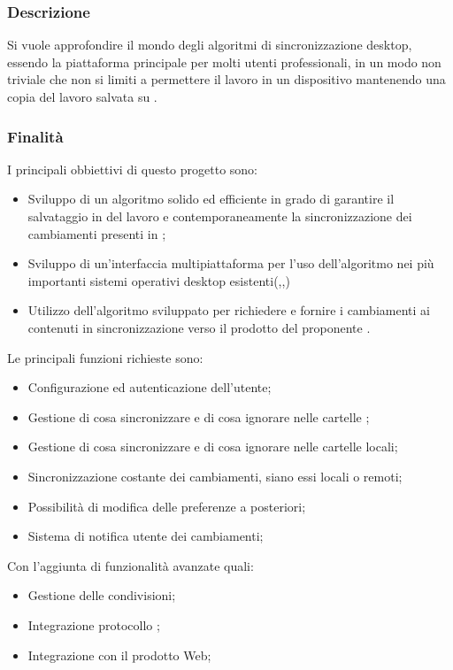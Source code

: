 \documentclass[]{article}
\begin{document}
		\subsubsection{Descrizione}
		Si vuole approfondire il mondo degli algoritmi di sincronizzazione desktop, essendo la piattaforma principale per molti utenti professionali, in un modo non triviale che non si limiti a permettere il lavoro in un dispositivo mantenendo una copia del lavoro salvata su .
		
		\subsubsection{Finalità}
		I principali obbiettivi di questo progetto sono:
		\begin{itemize}
			\item Sviluppo di un algoritmo solido ed efficiente in grado di garantire il salvataggio in  del lavoro e contemporaneamente la sincronizzazione dei cambiamenti presenti in   ;
			\item Sviluppo di un'interfaccia multipiattaforma per l'uso dell'algoritmo nei più importanti sistemi operativi desktop esistenti(,,)
			\item Utilizzo dell'algoritmo sviluppato per richiedere e fornire i cambiamenti ai contenuti in sincronizzazione verso il prodotto del proponente .
		\end{itemize}
		Le principali funzioni richieste sono:
		\begin{itemize}
			\item Configurazione ed autenticazione dell'utente;
			\item Gestione di cosa sincronizzare e di cosa ignorare nelle cartelle ;
			\item Gestione di cosa sincronizzare e di cosa ignorare nelle cartelle locali;
			\item Sincronizzazione costante dei cambiamenti, siano essi locali o remoti;
			\item Possibilità di modifica delle preferenze a posteriori;
			\item Sistema di notifica utente dei cambiamenti;
		\end{itemize}
		Con l'aggiunta di funzionalità avanzate quali:
		\begin{itemize}
			\item Gestione delle condivisioni;
			\item Integrazione protocollo ; 
			\item Integrazione con il prodotto Web;
		\end{itemize} 	
\end{document}
